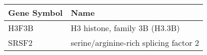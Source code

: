 \begin{tabular}{ll}
\toprule
Gene Symbol &                                   Name \\
\midrule
      H3F3B &          H3 histone, family 3B (H3.3B) \\
      SRSF2 & serine/arginine-rich splicing factor 2 \\
\bottomrule
\end{tabular}
